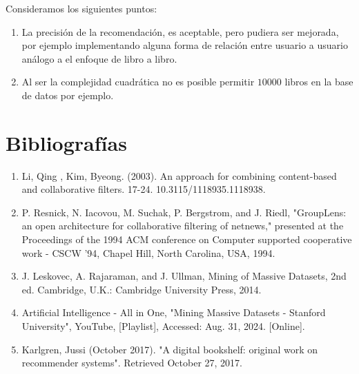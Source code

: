 \documentclass[14pt]{extarticle}
\begin{document}
Consideramos los siguientes puntos:

\begin{enumerate}
    \item La precisión de la recomendación, es aceptable, pero pudiera ser mejorada, por ejemplo implementando alguna forma de relación entre usuario a usuario análogo a el enfoque de libro a libro.
    \item Al ser la complejidad cuadrática no es posible permitir $10000$ libros en la base de datos por ejemplo.
\end{enumerate}



\section{Bibliografías}

\begin{enumerate}
    \item Li, Qing , Kim, Byeong. (2003). An approach for combining content-based and collaborative filters. 17-24. 10.3115/1118935.1118938. 
    \item P. Resnick, N. Iacovou, M. Suchak, P. Bergstrom, and J. Riedl, "GroupLens: an open architecture for collaborative filtering of netnews," presented at the Proceedings of the 1994 ACM conference on Computer supported cooperative work - CSCW '94, Chapel Hill, North Carolina, USA, 1994.
    \item J. Leskovec, A. Rajaraman, and J. Ullman, Mining of Massive Datasets, 2nd ed. Cambridge, U.K.: Cambridge University Press, 2014.
    \item Artificial Intelligence - All in One, "Mining Massive Datasets - Stanford University", YouTube, [Playlist], Accessed: Aug. 31, 2024. [Online]. 
    \item Karlgren, Jussi (October 2017). "A digital bookshelf: original work on recommender systems". Retrieved October 27, 2017.
\end{enumerate}
\end{document}
